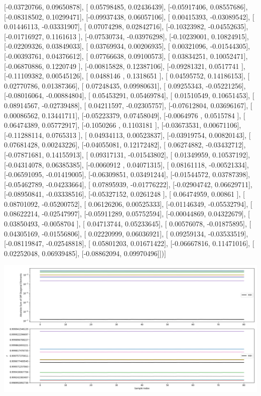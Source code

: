 \documentclass{article}
\begin{document}
       [-0.03720766,  0.09650878],
       [ 0.05798485,  0.02436439],
       [-0.05917406,  0.08557686],
       [-0.08318502,  0.10299471],
       [-0.09937438,  0.06057106],
       [ 0.00415393, -0.03089542],
       [ 0.01446113, -0.03331907],
       [ 0.07074298,  0.02842716],
       [-0.10323982, -0.04552635],
       [-0.01716927,  0.1161613 ],
       [-0.07530734, -0.03976298],
       [-0.10239001,  0.10824915],
       [-0.02209326,  0.03849033],
       [ 0.03769934,  0.00206935],
       [ 0.00321096, -0.01544305],
       [-0.00393761,  0.04376612],
       [ 0.07766638,  0.09100573],
       [ 0.03834251,  0.10052471],
       [-0.06870886,  0.1220749 ],
       [-0.00815828,  0.12387106],
       [-0.09281321,  0.0517741 ],
       [-0.11109382,  0.00545126],
       [ 0.0488146 ,  0.1318651 ],
       [ 0.04595752,  0.14186153],
       [ 0.02770786,  0.01387366],
       [ 0.07248435,  0.09980631],
       [ 0.09255343, -0.05221256],
       [-0.08016064, -0.00884804],
       [ 0.05453291,  0.05469784],
       [ 0.01510549,  0.10651453],
       [ 0.08914567, -0.02739488],
       [ 0.04211597, -0.02305757],
       [-0.07612804,  0.03696167],
       [ 0.00086562,  0.13441711],
       [-0.05223379,  0.07458049],
       [-0.0064976 ,  0.0515784 ],
       [ 0.06474389,  0.05772917],
       [-0.1050266 ,  0.1103181 ],
       [-0.03673531,  0.00671106],
       [-0.11288114,  0.0765313 ],
       [ 0.04934113,  0.00523837],
       [-0.03919754,  0.00820143],
       [ 0.07681428,  0.00243226],
       [-0.04055081,  0.12172482],
       [ 0.06274882, -0.03432712],
       [-0.07871681,  0.14155913],
       [ 0.09317131, -0.01543802],
       [ 0.01349959,  0.10537192],
       [-0.04314078,  0.06385385],
       [-0.0060912 ,  0.04071315],
       [ 0.08161118, -0.00521334],
       [-0.06591095, -0.01419005],
       [-0.06309851,  0.03491244],
       [-0.01544572,  0.03787398],
       [-0.05462789, -0.04233664],
       [ 0.07895939, -0.01776222],
       [-0.02904742,  0.06629711],
       [-0.08950841, -0.03338516],
       [-0.05327152,  0.0261248 ],
       [ 0.06474959,  0.00861   ],
       [ 0.08701092, -0.05200752],
       [ 0.06126206,  0.00525333],
       [-0.01146349, -0.05532794],
       [ 0.08622214, -0.02547997],
       [-0.05911289,  0.05752594],
       [-0.00044869,  0.04322679],
       [ 0.03850493, -0.0058704 ],
       [ 0.04713744,  0.05233645],
       [ 0.00576078, -0.01875895],
       [ 0.04305169, -0.01556806],
       [ 0.02220999,  0.06036921],
       [ 0.09259134, -0.03533519],
       [-0.08119847, -0.02548818],
       [ 0.05801203,  0.01671422],
       [-0.06667816,  0.11471016],
       [ 0.02252048,  0.06939485],
       [-0.08862094,  0.09970496]])]
\begin{center}
\includegraphics[scale=.9]{report_pickled_controls163/control_dpn_all.png}

\end{center}
\end{document}
